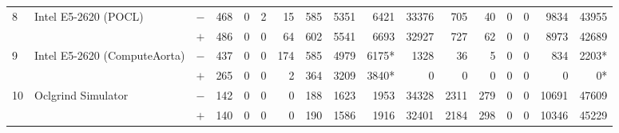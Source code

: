 \begin{tabular}{lll | rrrrrrr | rrrrrrr }
\hline
\multirow{ 2}{*}{8} & \multirow{ 2}{*}{Intel E5-2620 (POCL)} & $-$ & 468 & 0 & 2 & 15 & 585 & 5351 & 6421       & 33376 & 705 & 40 & 0 & 0 & 9834 & 43955 \\& & $+$ & 486 & 0 & 0 & 64 & 602 & 5541 & 6693 & 32927 & 727 & 62 & 0 & 0 & 8973 & 42689 \\
\hline
\multirow{ 2}{*}{9} & \multirow{ 2}{*}{Intel E5-2620 (ComputeAorta)} & $-$ & 437 & 0 & 0 & 174 & 585 & 4979 & 6175*       & 1328 & 36 & 5 & 0 & 0 & 834 & 2203* \\& & $+$ & 265 & 0 & 0 & 2 & 364 & 3209 & 3840* & 0 & 0 & 0 & 0 & 0 & 0 & 0* \\
\hline
\multirow{ 2}{*}{10} & \multirow{ 2}{*}{Oclgrind Simulator} & $-$ & 142 & 0 & 0 & 0 & 188 & 1623 & 1953       & 34328 & 2311 & 279 & 0 & 0 & 10691 & 47609 \\& & $+$ & 140 & 0 & 0 & 0 & 190 & 1586 & 1916 & 32401 & 2184 & 298 & 0 & 0 & 10346 & 45229 \\
  \bottomrule
\end{tabular}

